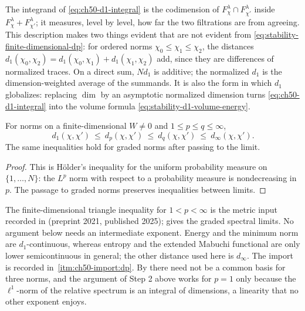 \begin{remark}
\label{rem:ch50-d1-reading}
The integrand of \eqref{eq:ch50-d1-integral} is the codimension of
$F^\lambda_\chi\cap F^\lambda_{\chi'}$ inside
$F^\lambda_\chi+F^\lambda_{\chi'}$; it measures, level by level, how far
the two filtrations are from agreeing.  This description makes two things
evident that are not evident from \eqref{eq:stability-finite-dimensional-dp}:
for ordered norms $\chi_0\le\chi_1\le\chi_2$, the distances
$d_1(\chi_0,\chi_2)=d_1(\chi_0,\chi_1)+d_1(\chi_1,\chi_2)$
add, since they are differences of normalized traces.  On a direct sum,
$N d_1$ is additive; the normalized $d_1$ is the dimension-weighted
average of the summands.  It is also the form in
which $d_1$ globalizes: replacing $\dim$ by an asymptotic normalized
dimension turns \eqref{eq:ch50-d1-integral} into the volume formula
\eqref{eq:stability-d1-volume-energy}.
\end{remark}

\begin{proposition}
\label{prop:ch50-dp-interpolation}
For norms on a finite-dimensional $W\ne0$ and $1\le p\le q\le\infty$,
\[
 d_1(\chi,\chi')\ \le\ d_p(\chi,\chi')\ \le\ d_q(\chi,\chi')
 \ \le\ d_\infty(\chi,\chi').
\tag{50.14}\label{eq:ch50-dp-interpolation}
\]
The same inequalities hold for graded norms after passing to the limit.
\end{proposition}

\begin{proof}
This is H\"older's inequality for the uniform probability measure on
$\{1,\dots,N\}$: the $L^p$ norm with respect to a probability measure
is nondecreasing in $p$.  The passage to graded norms preserves
inequalities between limits.
\end{proof}

\begin{remark}
\label{rem:ch50-dp-import}
The finite-dimensional triangle inequality for $1<p<\infty$ is the
metric input recorded in \cite[\S3.1]{BJKS1} (preprint 2021, published
2025); \cite[Theorem~3.3]{BJKS1} gives the graded spectral limits.  No
argument below needs an intermediate exponent.  Energy and the minimum
norm are $d_1$-continuous, whereas entropy and the extended Mabuchi
functional are only lower semicontinuous in general; the other distance
used here is $d_\infty$.  The import is recorded in
\,\cref{itm:ch50-import:dp}.  By
 there need not be a common basis for three
norms, and
the argument of Step 2 above works for $p=1$ only because the
$\ell^1$-norm of the relative spectrum is an integral of dimensions, a
linearity that no other exponent enjoys.
\end{remark}

